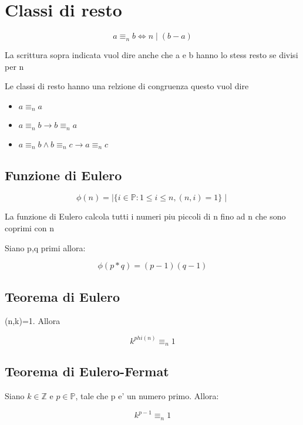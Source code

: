 \documentclass{article}
\begin{document}
  \section{Classi di resto}
  \begin{equation*}
    a \equiv_n b \iff n\mid (b-a)
  \end{equation*}
  \begin{flushleft}
    La scrittura sopra indicata vuol dire anche che a e b hanno lo stess resto se divisi per n
  \end{flushleft}
  \begin{flushleft}
    Le classi di resto hanno una relzione di congruenza questo vuol dire
  \end{flushleft}
  \begin{itemize}
    \item $a \equiv_n a$
    \item $a \equiv_n b \to b \equiv_n a$
    \item $a \equiv_n b \land b \equiv_n c \to a \equiv_n c$
  \end{itemize}
  \subsection{Funzione di Eulero}
  \begin{equation*}
    \phi(n)=\mid \{ i \in \mathbb{P} : 1 \leq i \leq n,(n,i)=1 \} \mid
  \end{equation*}
  \begin{flushleft}
    La funzione di Eulero calcola tutti i numeri piu piccoli di n fino ad n che sono coprimi con n
  \end{flushleft}
  \begin{flushleft}
    Siano p,q primi allora:
  \end{flushleft}
  \begin{equation*}
    \phi(p*q)=(p-1)(q-1)
  \end{equation*}
  \subsection{Teorema di Eulero}
  \begin{flushleft}
    (n,k)=1. Allora
  \end{flushleft}
  \begin{equation*}
    k^{phi(n)} \equiv_n 1
  \end{equation*}
  \subsection{Teorema di Eulero-Fermat}
  \begin{flushleft}
    Siano $k \in \mathbb{Z}$ e $p \in \mathbb{P}$, tale che p e' un numero primo. Allora:
  \end{flushleft}
  \begin{equation*}
    k^{p-1} \equiv_n 1
  \end{equation*}
\end{document}
